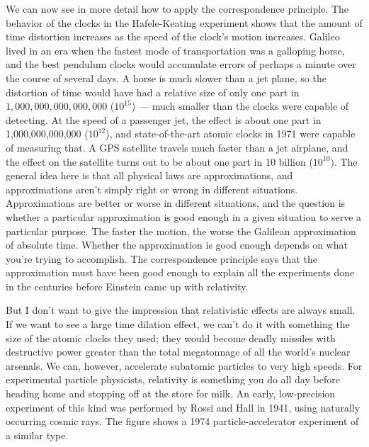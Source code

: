 \begin{figure}\label{fig:correspondence-dramatized}
\end{figure}

We can now see in more detail how to apply the correspondence principle. The behavior of the clocks in the
Hafele-Keating experiment shows that the amount of time distortion increases as the speed of the clock's motion
increases. Galileo lived in an era when the fastest
mode of transportation was a galloping horse, and the best
pendulum clocks would accumulate errors of perhaps a minute over the course of several days.
A horse is much slower than a jet plane, so the
distortion of time would have had a relative size of only one part in $1,000,000,000,000,000$ ($10^{15}$)
--- much smaller than the clocks were capable of detecting.
At the speed of a passenger jet, the effect is about one part in 1,000,000,000,000 ($10^{12}$),
and state-of-the-art atomic clocks in 1971 were capable of measuring that.
A GPS satellite travels much faster than a jet airplane, and the effect on the satellite
turns out to be about one part in 10 billion ($10^{10})$. The general idea here is that all physical laws are approximations, and
approximations aren't simply right or wrong in different situations. Approximations are better or worse
in different situations, and the question is whether a particular approximation is good enough in a given
situation to serve a particular purpose. The faster the motion, the worse the Galilean approximation of
absolute time. Whether the approximation is good enough depends on what you're trying to accomplish.
The correspondence principle says that the approximation must have been good enough to explain
all the experiments done in the centuries before Einstein came up with relativity.


But I don't want to give the impression that relativistic effects are always small.
If we want to see a large time dilation
effect, we can't do it with something the size of the atomic clocks they used; they would become deadly missiles with
destructive power
greater than the total megatonnage of all the world's nuclear arsenals. We can, however, accelerate subatomic particles
to very high speeds. For experimental particle physicists, relativity is something you do all day
before heading home and stopping off at the store for milk. An early, low-precision experiment of this kind was
performed by Rossi and Hall in 1941, using naturally occurring cosmic rays. The figure shows
a 1974 particle-accelerator experiment of a similar type.

